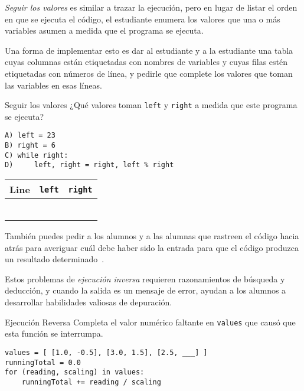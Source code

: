 \emph{Seguir los valores} es similar a trazar la ejecución, 
pero en lugar de listar el orden en que se ejecuta el código, 
el estudiante enumera los valores que una o más variables asumen
 a medida que el programa se ejecuta.

Una forma de implementar esto es dar al estudiante y a la estudiante una tabla 
cuyas columnas están etiquetadas con nombres de variables 
y cuyas filas estén etiquetadas con números de línea, 
y pedirle que complete los valores que toman las variables en esas líneas.

\newpage
\begin{aside}{Seguir los valores}
  ¿Qué valores toman \texttt{left} y \texttt{right} a medida que este programa se ejecuta?

\begin{verbatim}
A) left = 23
B) right = 6
C) while right:
D)     left, right = right, left % right
\end{verbatim}
\end{aside}

\begin{center}
\begin{tabular}{|l|l|l|}
  \hline
  Line & \texttt{left} & \texttt{right} \\
  \hline
  & & \\
  \hline
  & & \\
  \hline
  & & \\
  \hline
  & & \\
  \hline
  & & \\
  \hline
  & & \\
  \hline
\end{tabular}
\end{center}

También puedes pedir a los alumnos y a las alumnas que rastreen el código hacia atrás para averiguar cuál debe haber sido la entrada para que el código produzca un resultado determinado~\cite{Armo2008}.


Estos problemas de  \emph{ejecución inversa} requieren razonamientos de búsqueda y deducción, 
y cuando la salida es un mensaje de error, 
ayudan a los alumnos a desarrollar habilidades valiosas de depuración.

\begin{aside}{Ejecución Reversa}
  Completa el valor numérico faltante en \texttt{values}
  que causó que esta función se interrumpa.

\begin{verbatim}
values = [ [1.0, -0.5], [3.0, 1.5], [2.5, ___] ]
runningTotal = 0.0
for (reading, scaling) in values:
    runningTotal += reading / scaling
\end{verbatim}
\end{aside}

